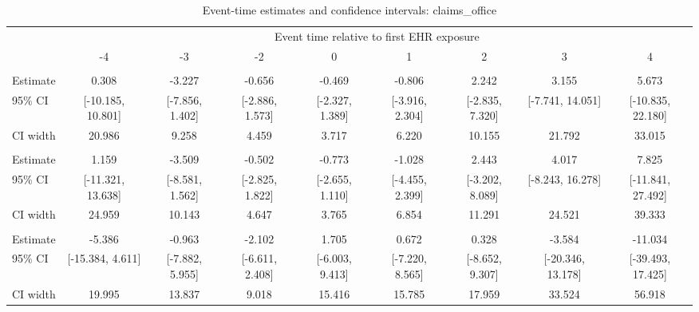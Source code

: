 
\begin{landscape}\begin{table}[!h]
\centering
\caption{\label{tab:ci_claims_office}Event-time estimates and confidence intervals: claims_office}
\centering
\fontsize{9}{11}\selectfont
\begin{tabular}[t]{lcccccccc}
\toprule
\multicolumn{1}{c}{ } & \multicolumn{8}{c}{Event time relative to first EHR exposure} \\
\cmidrule(l{3pt}r{3pt}){2-9}
 & -4 & -3 & -2 & 0 & 1 & 2 & 3 & 4\\
\midrule
\addlinespace[0.3em]
\multicolumn{9}{l}{\textbf{All}}\\
\hspace{1em}Estimate & 0.308 & -3.227 & -0.656 & -0.469 & -0.806 & 2.242 & 3.155 & 5.673\\
\hspace{1em}95\% CI & {}[-10.185, 10.801] & {}[-7.856, 1.402] & {}[-2.886, 1.573] & {}[-2.327, 1.389] & {}[-3.916, 2.304] & {}[-2.835, 7.320] & {}[-7.741, 14.051] & {}[-10.835, 22.180]\\
\hspace{1em}CI width & 20.986 & 9.258 & 4.459 & 3.717 & 6.220 & 10.155 & 21.792 & 33.015\\
\addlinespace[0.3em]
\multicolumn{9}{l}{\textbf{Age $\leq$ 60}}\\
\hspace{1em}Estimate & 1.159 & -3.509 & -0.502 & -0.773 & -1.028 & 2.443 & 4.017 & 7.825\\
\hspace{1em}95\% CI & {}[-11.321, 13.638] & {}[-8.581, 1.562] & {}[-2.825, 1.822] & {}[-2.655, 1.110] & {}[-4.455, 2.399] & {}[-3.202, 8.089] & {}[-8.243, 16.278] & {}[-11.841, 27.492]\\
\hspace{1em}CI width & 24.959 & 10.143 & 4.647 & 3.765 & 6.854 & 11.291 & 24.521 & 39.333\\
\addlinespace[0.3em]
\multicolumn{9}{l}{\textbf{Age $\geq$ 60}}\\
\hspace{1em}Estimate & -5.386 & -0.963 & -2.102 & 1.705 & 0.672 & 0.328 & -3.584 & -11.034\\
\hspace{1em}95\% CI & {}[-15.384, 4.611] & {}[-7.882, 5.955] & {}[-6.611, 2.408] & {}[-6.003, 9.413] & {}[-7.220, 8.565] & {}[-8.652, 9.307] & {}[-20.346, 13.178] & {}[-39.493, 17.425]\\
\hspace{1em}CI width & 19.995 & 13.837 & 9.018 & 15.416 & 15.785 & 17.959 & 33.524 & 56.918\\
\bottomrule
\end{tabular}
\end{table}
\end{landscape}
